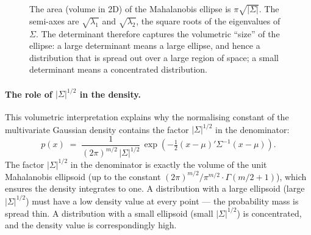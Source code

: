 \documentclass[11pt, a4paper, oneside]{article}
\begin{document}
\begin{figure}[H]
\centering
{}
\caption{The area (volume in 2D) of the Mahalanobis ellipse is
$\pi \sqrt{|\Sigma|}$. The semi-axes are $\sqrt{\lambda_1}$ and
$\sqrt{\lambda_2}$, the square roots of the eigenvalues of $\Sigma$.
The determinant therefore captures the volumetric ``size'' of the
ellipse: a large determinant means a large ellipse, and hence a
distribution that is spread out over a large region of space; a
small determinant means a concentrated distribution.}
\label{fig:volume-ellipsoid}
\end{figure}

\paragraph{The role of $|\Sigma|^{1/2}$ in the density.}
This volumetric interpretation explains why the normalising constant
of the multivariate Gaussian density contains the factor
$|\Sigma|^{1/2}$ in the denominator:
\[
p(x) \;=\; \frac{1}{(2\pi)^{m/2}\, |\Sigma|^{1/2}}\, \exp\!\left(-\tfrac{1}{2}(x-\mu)'\Sigma^{-1}(x-\mu)\right).
\]
The factor $|\Sigma|^{1/2}$ in the denominator is exactly the volume
of the unit Mahalanobis ellipsoid (up to the constant
$(2\pi)^{m/2} / \pi^{m/2} \cdot \Gamma(m/2 + 1)$), which ensures the
density integrates to one. A distribution with a large ellipsoid
(large $|\Sigma|^{1/2}$) must have a low density value at every
point — the probability mass is spread thin. A distribution with a
small ellipsoid (small $|\Sigma|^{1/2}$) is concentrated, and the
density value is correspondingly high.
\end{document}
